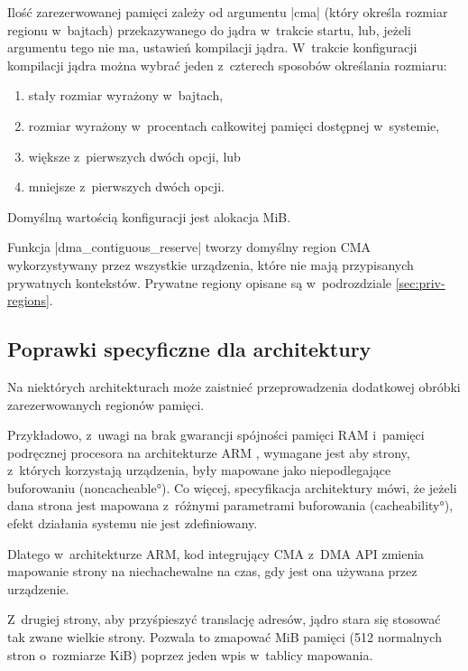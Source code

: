 Ilość zarezerwowanej pamięci zależy od argumentu \code|cma|
(który określa rozmiar regionu w~bajtach) przekazywanego do jądra
w~trakcie startu, lub, jeżeli argumentu tego nie ma, ustawień
kompilacji jądra.  W~trakcie konfiguracji kompilacji jądra można
wybrać jeden z~czterech sposobów określania rozmiaru:

\begin{enumerate}
\item stały rozmiar wyrażony w~bajtach,
\item rozmiar wyrażony w~procentach całkowitej pamięci dostępnej
  w~systemie,
\item większe z~pierwszych dwóch opcji, lub
\item mniejsze z~pierwszych dwóch opcji.
\end{enumerate}

Domyślną wartością konfiguracji jest alokacja \unit[16]{MiB}.

Funkcja \code|dma_contiguous_reserve| tworzy domyślny region CMA
wykorzystywany przez wszystkie urządzenia, które nie mają przypisanych
prywatnych kontekstów.  Prywatne regiony opisane są w~podrozdziale
\ref{sec:priv-regions}.


\subsection{Poprawki specyficzne dla architektury}

Na niektórych architekturach może zaistnieć przeprowadzenia dodatkowej
obróbki zarezerwowanych regionów pamięci.

Przykładowo, z~uwagi na brak gwarancji spójności pamięci RAM i~pamięci
podręcznej procesora na architekturze ARM
\autocite[podrozdział B5.5]{bib:arm-arch-reference}, wymagane
jest aby strony, z~których korzystają urządzenia, były mapowane jako
niepodlegające buforowaniu (\ang{noncacheable}).  Co więcej,
specyfikacja architektury mówi, że jeżeli dana strona jest mapowana
z~różnymi parametrami buforowania (\ang{cacheability}), efekt
działania systemu nie jest zdefiniowany.

Dlatego w~architekturze ARM, kod integrujący CMA z~DMA API zmienia
mapowanie strony na niechachewalne na czas, gdy jest ona używana przez
urządzenie.

Z~drugiej strony, aby przyśpieszyć translację adresów, jądro stara się
stosować tak zwane wielkie strony.  Pozwala to zmapować \unit[2]{MiB}
pamięci (512 normalnych stron o~rozmiarze \unit[4]{KiB}) poprzez jeden
wpis w~tablicy mapowania.

